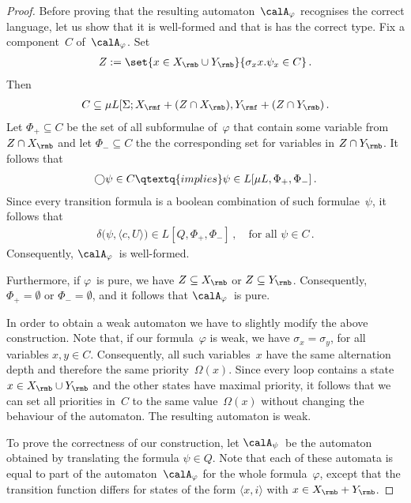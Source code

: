 \documentclass[10pt, fleqn]{scrartcl}
\newcommand*{\?}{\kern .08em}
\newcommand\medcircle{\bigcirc}
\begin{document}
\begin{proof}
Before proving that the resulting automaton~$\calA_\varphi$ recognises the correct language,
let us show that it is well-formed and that is has the correct type.
Fix a component~$C$ of~$\calA_\varphi$.
Set
\begin{align*}
  Z := \set{ x \in X_\rmb \cup Y_\rmb }{ \sigma_x x.\psi_x \in C }\,.
\end{align*}
Then
\begin{align*}
  C \subseteq \mu L[\Sigma;X_\rmf + (Z \cap X_\rmb),Y_\rmf + (Z \cap Y_\rmb)\,.
\end{align*}
Let $\Phi_+ \subseteq C$ be the set of all subformulae of~$\varphi$ that contain some variable
from $Z \cap X_\rmb$ and let $\Phi_- \subseteq C$ the the corresponding set for variables
in $Z \cap Y_\rmb$.
It follows that
\begin{align*}
  {\medcircle}\psi \in C
  \qtextq{implies}
  \psi \in L[\mu L,\Phi_+,\Phi_-]\,.
\end{align*}
Since every transition formula is a boolean combination of such formulae~$\psi$, it follows that
\begin{align*}
  \delta\bigl(\psi,\langle c,U\rangle\bigr) \in L[Q,\Phi_+,\Phi_-]\,,
  \quad\text{for all } \psi \in C\,.
\end{align*}
Consequently, $\calA_\varphi$~is well-formed.

Furthermore, if $\varphi$~is pure, we have $Z \subseteq X_\rmb$ or $Z \subseteq Y_\rmb$.
Consequently, $\Phi_+ = \emptyset$ or $\Phi_- = \emptyset$, and it follows that
$\calA_\varphi$~is pure.

In order to obtain a weak automaton we have to slightly modify the above construction.
Note that, if our formula~$\varphi$ is weak, we have
$\sigma_x = \sigma_y$, for all variables $x,y \in C$.
Consequently, all such variables~$x$ have the same alternation depth
and therefore the same priority~$\Omega(x)$.
Since every loop contains a state $x \in X_\rmb \cup Y_\rmb$ and
the other states have maximal priority, it follows that we can set all priorities in~$C$
to the same value~$\Omega(x)$ without changing the behaviour of the automaton.
The resulting automaton is weak.

To prove the correctness of our construction,
let $\calA_\psi$~be the automaton obtained by translating the formula $\psi \in Q$.
Note that each of these automata is equal to part of the automaton~$\calA_\varphi$ for the
whole formula~$\varphi$, except that the transition function differs for states of the form
$\langle x,i\rangle$ with $x \in X_\rmb + Y_\rmb$.


\end{proof}
\end{document}
